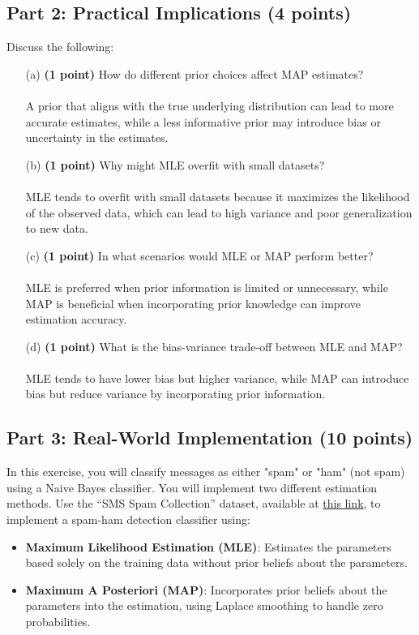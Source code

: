 \documentclass{article}
\begin{document}
\subsection*{Part 2: Practical Implications (4 points)}
Discuss the following:
\begin{enumerate}
    \item[(a)] \textbf{(1 point)} How do different prior choices affect MAP estimates?
    \\\\ A prior that aligns with the true underlying distribution can lead to more accurate estimates, while a less informative prior may introduce bias or uncertainty in the estimates.
    \item[(b)] \textbf{(1 point)} Why might MLE overfit with small datasets?
    \\\\ MLE tends to overfit with small datasets because it maximizes the likelihood of the observed data, which can lead to high variance and poor generalization to new data.
    \item[(c)] \textbf{(1 point)} In what scenarios would MLE or MAP perform better?
    \\\\ MLE is preferred when prior information is limited or unnecessary, while MAP is beneficial when incorporating prior knowledge can improve estimation accuracy.
    \item[(d)] \textbf{(1 point)} What is the bias-variance trade-off between MLE and MAP?
    \\\\ MLE tends to have lower bias but higher variance, while MAP can introduce bias but reduce variance by incorporating prior information.
\end{enumerate}

\subsection*{Part 3: Real-World Implementation (10 points)}
In this exercise, you will classify messages as either "spam" or "ham" (not spam) using a Naive Bayes classifier. You will implement two different estimation methods. Use the ``SMS Spam Collection'' dataset, available at \href{https://archive.ics.uci.edu/ml/datasets/SMS+Spam+Collection}{this link}, to implement a spam-ham detection classifier using:

\begin{itemize}
    \item \textbf{Maximum Likelihood Estimation (MLE)}: Estimates the parameters based solely on the training data without prior beliefs about the parameters.
    \item \textbf{Maximum A Posteriori (MAP)}: Incorporates prior beliefs about the parameters into the estimation, using Laplace smoothing to handle zero probabilities.
\end{itemize}
\end{document}
